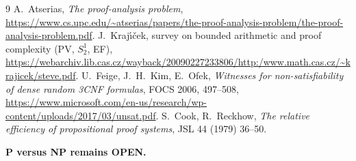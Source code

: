 \documentclass[11pt]{article}
\begin{document}
\begin{thebibliography}{9}
 A.~Atserias, \emph{The proof-analysis problem},
\url{https://www.cs.upc.edu/~atserias/papers/the-proof-analysis-problem/the-proof-analysis-problem.pdf}.
 J.~Kraj\'{\i}\v{c}ek, survey on bounded arithmetic and
proof complexity (PV, $S^1_2$, EF),
\url{https://webarchiv.lib.cas.cz/wayback/20090227233806/http:/www.math.cas.cz/~krajicek/steve.pdf}.
 U.~Feige, J.~H.~Kim, E.~Ofek, \emph{Witnesses for
non-satisfiability of dense random 3CNF formulas}, FOCS 2006, 497--508,
\url{https://www.microsoft.com/en-us/research/wp-content/uploads/2017/03/unsat.pdf}.
 S.~Cook, R.~Reckhow, \emph{The relative efficiency of
propositional proof systems}, JSL 44 (1979) 36--50.
\end{thebibliography}

\noindent\textbf{P versus NP remains OPEN.}
\end{document}
